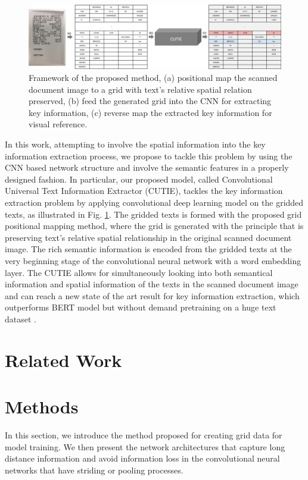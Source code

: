 \documentclass[10pt,twocolumn,letterpaper]{article}
\begin{document}
\begin{figure}
\begin{center}
\includegraphics[width=0.99\linewidth]{Model.png}
\end{center}
   \caption{Framework of the proposed method, (a) positional map the scanned document image to a grid with text's relative spatial relation preserved, (b) feed the generated grid into the CNN for extracting key information, (c) reverse map the extracted key information for visual reference.}
\label{fig:cutie}
\end{figure}
In this work, attempting to involve the spatial information into the key information extraction process, we propose to tackle this problem by using the CNN based network structure and involve the semantic features in a properly designed fashion. In particular, our proposed model, called Convolutional Universal Text Information Extractor (CUTIE), tackles the key information extraction problem by applying convolutional deep learning model on the gridded texts, as illustrated in Fig. \ref{fig:cutie}. The gridded texts is formed with the proposed grid positional mapping method, where the grid is generated with the principle that is preserving text's relative spatial relationship in the original scanned document image. The rich semantic information is encoded from the gridded texts at the very beginning stage of the convolutional neural network with a word embedding layer. The CUTIE allows for simultaneously looking into both semantical information and spatial information of the texts in the scanned document image and can reach a new state of the art result for key information extraction, which outperforms BERT model but without demand pretraining on a huge text dataset \cite{bert,transformer}.


\section{Related Work}


\section{Methods}
In this section, we introduce the method proposed for creating grid data for model training. We then present the network architectures that capture long distance information and avoid information loss in the convolutional neural networks that have striding or pooling processes.
\end{document}
